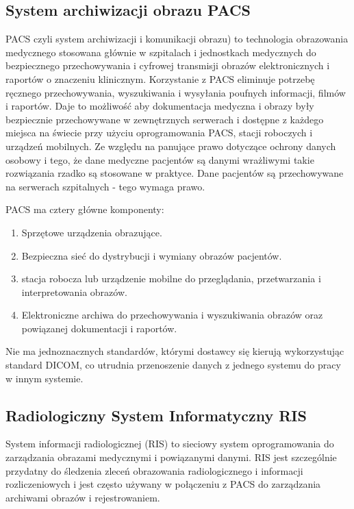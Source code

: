 \documentclass[a4paper,11pt,twoside]{report}
\theoremstyle{definition}
\begin{document}
\subsection{System archiwizacji obrazu PACS}
PACS czyli system archiwizacji i komunikacji obrazu) to technologia obrazowania medycznego stosowana głównie w szpitalach i jednostkach medycznych do bezpiecznego przechowywania i cyfrowej transmisji obrazów elektronicznych i raportów o znaczeniu klinicznym. Korzystanie z PACS eliminuje potrzebę ręcznego przechowywania, wyszukiwania i wysyłania poufnych informacji, filmów i raportów. Daje to możliwość aby dokumentacja medyczna i obrazy były bezpiecznie przechowywane w zewnętrznych serwerach i dostępne z każdego miejsca na świecie przy użyciu oprogramowania PACS, stacji roboczych i urządzeń mobilnych. Ze względu na panujące prawo dotyczące ochrony danych osobowy i tego, że dane medyczne pacjentów są danymi wrażliwymi takie rozwiązania rzadko są stosowane w praktyce. Dane pacjentów są przechowywane na serwerach szpitalnych - tego wymaga prawo.
\par
PACS ma cztery główne komponenty: 
\begin{enumerate}
	\item Sprzętowe urządzenia obrazujące.
	\item Bezpieczna sieć do dystrybucji i wymiany obrazów pacjentów.
	\item stacja robocza lub urządzenie mobilne do przeglądania, przetwarzania i interpretowania obrazów.
	\item Elektroniczne archiwa do przechowywania i wyszukiwania obrazów oraz powiązanej dokumentacji i raportów.
\end{enumerate}
Nie ma jednoznacznych standardów, którymi dostawcy się kierują wykorzystując standard DICOM, co utrudnia przenoszenie danych z jednego systemu do pracy w innym systemie. 

\subsection{Radiologiczny System Informatyczny RIS}
System informacji radiologicznej (RIS) to sieciowy system oprogramowania do zarządzania obrazami medycznymi i powiązanymi danymi. RIS jest szczególnie przydatny do śledzenia zleceń obrazowania radiologicznego i informacji rozliczeniowych i jest często używany w połączeniu z PACS do zarządzania archiwami obrazów i rejestrowaniem.
\end{document}
